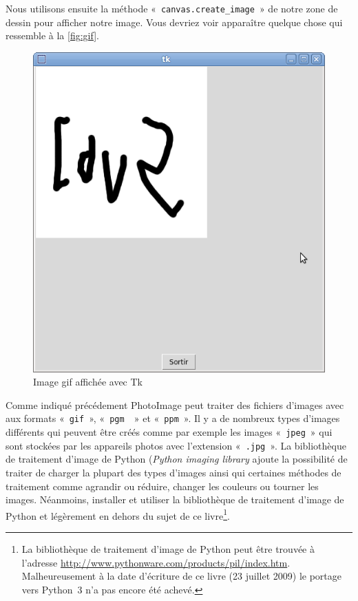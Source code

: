 Nous utilisons ensuite la méthode «~\texttt{canvas.create\_image}~» de notre zone de dessin pour afficher notre image. Vous devriez voir apparaître quelque chose qui ressemble à la \autoref{fig:gif}. 
\begin{figure}[h!]
\centering
\includegraphics[scale=0.4]{images/gif}
\caption{Image gif affichée avec Tk}\label{fig:gif}
\end{figure}


Comme indiqué précédement PhotoImage peut traiter des fichiers d'images avec aux formats «~\texttt{gif}~», «~\texttt{pgm~}~» et «~\texttt{ppm}~».
Il y a de nombreux types d'images différents qui peuvent être créés comme par exemple les images «~\texttt{jpeg}~» qui sont stockées par les appareils photos avec l'extension «~\texttt{.jpg}~». 
La bibliothèque de traitement d'image de Python (\emph{Python imaging library} ajoute la possibilité de traiter de charger la plupart des types d'images ainsi qui certaines méthodes de traitement comme agrandir ou réduire, changer les couleurs ou tourner les images.  Néanmoins, installer et utiliser la bibliothèque de traitement d'image de Python et légèrement en dehors du sujet de ce livre\footnote{La  bibliothèque de traitement d'image de Python peut être trouvée à l'adresse \url{http://www.pythonware.com/products/pil/index.htm}. Malheureusement à la date d'écriture de ce livre (23 juillet 2009) le portage vers Python~3 n'a pas encore été achevé.}. 

